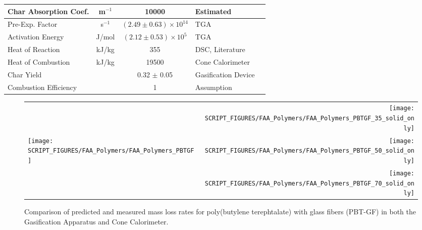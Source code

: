 \begin{table}[h!]
\begin{center}
\begin{tabular}{|l|c|c|l|l|}
Char Absorption Coef.   &      m$^{-1}$ &       10000                       & Estimated                                 & \cite{Kempel:1}               \\ \hline
Pre-Exp. Factor         &      s$^{-1}$ & $(2.49 \pm 0.63) \times 10^{14}$  & TGA                                       & \cite{Kempel:1}               \\ \hline
Activation Energy       &    J/mol    & $(2.12 \pm 0.53) \times 10^{5}$   & TGA                                       & \cite{Kempel:1}               \\ \hline
Heat of Reaction        &      kJ/kg    &        355                        & DSC, Literature                           & \cite{Kempel:1,Lyon:Ency2005} \\ \hline
Heat of Combustion      &      kJ/kg    & 19500                             & Cone Calorimeter                          & \cite{Kempel:1}               \\ \hline
Char Yield              &               & 0.32 $\pm$ 0.05                   & Gasification Device                       & \cite{Kempel:1}               \\ \hline
Combustion Efficiency   &               &          1                        & Assumption                                & \cite{Kempel:1}               \\ \hline
\end{tabular}
\end{center}
\label{Properties_PBT-GF}
\end{table}

\begin{figure}[h!]
\begin{tabular*}{\textwidth}{l@{\extracolsep{\fill}}r}
 &
\texttt{[image: SCRIPT\_FIGURES/FAA\_Polymers/FAA\_Polymers\_PBTGF\_35\_solid\_only]} \\
\texttt{[image: SCRIPT\_FIGURES/FAA\_Polymers/FAA\_Polymers\_PBTGF]} &
\texttt{[image: SCRIPT\_FIGURES/FAA\_Polymers/FAA\_Polymers\_PBTGF\_50\_solid\_only]} \\
 &
\texttt{[image: SCRIPT\_FIGURES/FAA\_Polymers/FAA\_Polymers\_PBTGF\_70\_solid\_only]}
\end{tabular*}
\caption[Mass loss rate of poly(butylene terephtalate) with glass fibers (PBT-GF)]
{Comparison of predicted and measured mass loss rates for poly(butylene terephtalate) with glass fibers (PBT-GF) in both the Gasification Apparatus and Cone Calorimeter.}
\label{HRR_PBTGF}
\end{figure}

